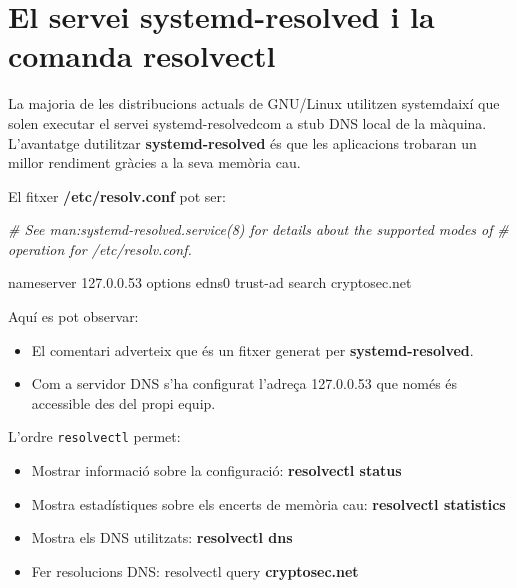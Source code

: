 \documentclass[]{article}
\newenvironment{Shaded}{}{}
\newcommand{\CommentTok}[1]{\textcolor[rgb]{0.38,0.63,0.69}{\textit{#1}}}
\newcommand{\ExtensionTok}[1]{#1}
\newcommand{\NormalTok}[1]{#1}
\begin{document}
\hypertarget{el-servei-systemd-resolved-i-la-comanda-resolvectl}{%
\section{\texorpdfstring{\textbf{El servei systemd-resolved i la comanda
resolvectl}}{El servei systemd-resolved i la comanda resolvectl}}\label{el-servei-systemd-resolved-i-la-comanda-resolvectl}}

La majoria de les distribucions actuals de GNU/Linux utilitzen
systemdaixí que solen executar el servei systemd-resolvedcom a stub DNS
local de la màquina. L'avantatge dutilitzar \textbf{systemd-resolved} és
que les aplicacions trobaran un millor rendiment gràcies a la seva
memòria cau.

El fitxer \textbf{/etc/resolv.conf} pot ser:

\begin{Shaded}
\begin{Highlighting}[]
\CommentTok{# See man:systemd-resolved.service(8) for details about the supported modes of}
\CommentTok{# operation for /etc/resolv.conf.}

\ExtensionTok{nameserver}\NormalTok{ 127.0.0.53}
\ExtensionTok{options}\NormalTok{ edns0 trust-ad}
\ExtensionTok{search}\NormalTok{ cryptosec.net}
\end{Highlighting}
\end{Shaded}

Aquí es pot observar:

\begin{itemize}
\item
  El comentari adverteix que és un fitxer generat per
  \textbf{systemd-resolved}.
\item
  Com a servidor DNS s'ha configurat l'adreça 127.0.0.53 que només és
  accessible des del propi equip.
\end{itemize}

L'ordre \texttt{resolvectl} permet:

\begin{itemize}
\item
  Mostrar informació sobre la configuració: \textbf{resolvectl status}
\item
  Mostra estadístiques sobre els encerts de memòria cau:
  \textbf{resolvectl statistics}
\item
  Mostra els DNS utilitzats: \textbf{resolvectl dns}
\item
  Fer resolucions DNS: resolvectl query \textbf{cryptosec.net}
\end{itemize}
\end{document}

